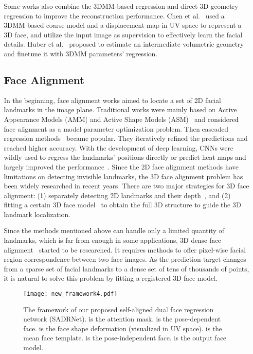 \documentclass[journal]{IEEEtran}
\begin{document}
	Some works also combine the 3DMM-based regression and direct 3D geometry regression to improve the reconstruction performance. Chen et al.~\cite{UVdisplacement} used a 3DMM-based coarse model and a displacement map in UV space to represent a 3D face, and utilize the input image as supervision to effectively learn the facial details. Huber et al.~\cite{MMFace2019_CVPR} proposed to  estimate an intermediate volumetric geometry and finetune it with 3DMM parameters' regression.

	\subsection{Face Alignment}
	In the beginning, face alignment works aimed to locate a set of 2D facial landmarks in the image plane. Traditional works were mainly based on Active Appearance Models (AMM) and Active Shape Models (ASM)~\cite{AAM,ASM,align1,align2,align3} and considered face alignment as a model parameter optimization problem. Then cascaded regression methods~\cite{CPR1,CPR2} became popular. They iteratively refined the predictions and reached higher accuracy. With the development of deep learning, CNNs were wildly used to regress the landmarks' positions directly or predict heat maps and largely improved the performance~\cite{wingloss,cnnalign1,PengECCV16,JVCR}. Since the 2D face alignment methods have limitations on detecting invisible landmarks, the 3D face alignment problem has been widely researched in recent years. There are two major strategies for 3D face alignment: (1) separately detecting 2D landmarks and their depth~\cite{how_far,BMVC2016_86,Bulat2016TwoStageCP}, and (2) fitting a certain 3D face model~\cite{hough_ECCV16,without_cor_ECCV16} to obtain the full 3D structure to guide the 3D landmark localization.
	
	Since the methods mentioned above can handle only a limited quantity of landmarks, which is far from enough in some applications, 3D dense face alignment~\cite{defa_2017_ICCV} started to be researched. It requires methods to offer pixel-wise facial region correspondence between two face images. As the prediction target changes from a sparse set of facial landmarks to a dense set of tens of thousands of points, it is natural to solve this problem by fitting a registered 3D face model.
	
	\begin{figure*}[htbp]
		\begin{center}
			
			\texttt{[image: new\_framework4.pdf]}
		\end{center}
		\caption{The framework of our proposed self-aligned dual face regression network (SADRNet).  is the attention mask.  is the pose-dependent face.  is the face shape deformation (visualized in UV space).  is the mean face template.  is the pose-independent face.  is the output face model.
		}
		\label{fig:framework}
	\end{figure*}
	
\end{document}
